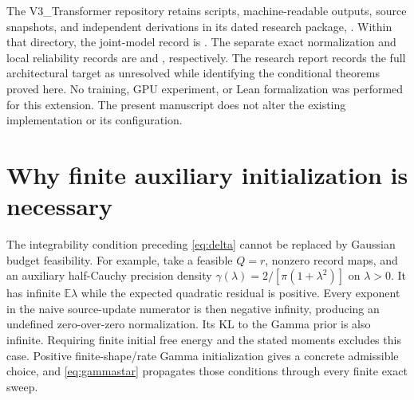 \documentclass[11pt]{article}
\newcommand{\E}{\mathbb E}
\begin{document}
The V3\_Transformer repository retains scripts, machine-readable outputs, source snapshots, and independent derivations in its dated research package, . Within that directory, the joint-model record is . The separate exact normalization and local reliability records are  and , respectively. The research report records the full architectural target as unresolved while identifying the conditional theorems proved here. No training, GPU experiment, or Lean formalization was performed for this extension. The present manuscript does not alter the existing implementation or its configuration.

\section{Why finite auxiliary initialization is necessary}

The integrability condition preceding \eqref{eq:delta} cannot be replaced by Gaussian budget feasibility. For example, take a feasible $Q=r$, nonzero record maps, and an auxiliary half-Cauchy precision density $\gamma(\lambda)=2/[\pi(1+\lambda^2)]$ on $\lambda>0$. It has infinite $\E\lambda$ while the expected quadratic residual is positive. Every exponent in the naive source-update numerator is then negative infinity, producing an undefined zero-over-zero normalization. Its KL to the Gamma prior is also infinite. Requiring finite initial free energy and the stated moments excludes this case. Positive finite-shape/rate Gamma initialization gives a concrete admissible choice, and \eqref{eq:gammastar} propagates those conditions through every finite exact sweep.
\end{document}
